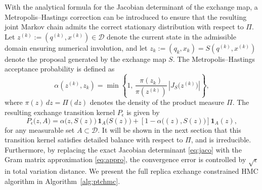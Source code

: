 \documentclass[12pt]{article}
\begin{document}
With the analytical formula for the Jacobian determinant of the exchange map, a Metropolis--Hastings correction can be introduced to ensure that the resulting joint Markov chain admits the correct stationary distribution with respect to $\Pi$. Let $z^{(k)}:=(q^{(k)}, x^{(k)}) \in \mathcal{D}$ denote the current state in the admissible domain ensuring numerical involution, and let
\(
z_k:=(q_k, x_k) = S(q^{(k)}, x^{(k)})
\)
denote the proposal generated by the exchange map $S$. The Metropolis--Hastings acceptance probability is defined as
\begin{equation}\label{eq:accept}
\alpha\!\left( z^{(k)}, z_k \right)
=
\min\!\left\{
1,\,
\frac{\pi(z_k)}
     {\pi\!\left(z^{(k)}\right)}
\, |J_S\big(z^{(k)}\big)|
\right\},
\end{equation}
where $\pi(z)\,dz = \Pi(dz)$ denotes the density of the product measure $\Pi$.
The resulting exchange transition kernel $P_\epsilon$ is given by
\begin{equation}\label{eq:kernel}
    P_\epsilon\big(z, A\big)
=
\alpha\big(z, S(z)\big)\,
\mathbf{1}_{A}\!\big(S(z)\big)
+
\left[
1 - \alpha\big((z), S(z)\big)
\right]
\mathbf{1}_{A}(z),
\end{equation}
for any measurable set $A \subset \mathcal{D}$.
It will be shown in the next section that this transition kernel satisfies detailed balance with respect to $\Pi$, and is irreducible.
Furthermore, by replacing the exact Jacobian determinant \eqref{eq:jaco} with the Gram matrix approximation \eqref{eq:appro}, the convergence error is controlled by $\sqrt\epsilon$ in total variation distance.
We present the full replica exchange constrained HMC algorithm in Algorithm~\ref{alg:ptchmc}.
\end{document}
